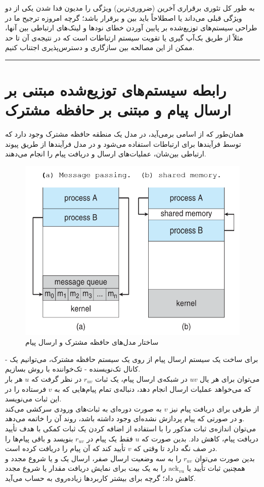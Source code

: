 \documentclass{article}
\begin{document}
\begin{multicols}{2}
\begin{itemize}
\end{itemize}

\pagebreak

به طور کل تئوری  برقراری آخرین (ضروری‌ترین) ویژگی را مدیون فدا شدن یکی از دو ویژگی قبلی می‌داند یا اصطلاحاً باید
بین  و 
برقرار باشد؛ گرچه امروزه ترجیح ما در طراحی سیستم‌های توزیع‌شده بر پایین آوردن خطای نودها و لینک‌های ارتباطی بین آنها، مثلاً از طریق بک‌آپ گیری یا تقویت سیستم ارتباطات است که در نتیجه‌ی آن تا حد ممکن از این مصالحه بین سازگاری و دسترس‌پذیری اجتناب کنیم.
\rule{\linewidth}{1pt}
\section{رابطه سیستم‌های توزیع‌شده مبتنی بر 
ارسال پیام و مبتنی بر
حافظه مشترک}
همان‌طور که از اسامی برمی‌آید، در مدل  
یک منطقه حافظه مشترک وجود دارد که توسط فرآیندها برای ارتباطات استفاده می‌شود و در مدل 
فرآیندها از طریق پیوند ارتباطی بین‌شان، عملیات‌های ارسال و دریافت پیام را انجام می‌دهند.
\begin{figure}[H]
        \centering
        \includegraphics[width=0.8\linewidth]{Photos/HW1/shared-pass.png}
        \caption{ساختار مدل‌های حافظه مشترک و ارسال پیام}
        \label{fig:my_label}
\end{figure}
- برای ساخت یک سیستم ارسال پیام از روی یک سیستم حافظه مشترک، می‌توانیم یک کانال تک‌نویسنده - تک‌خواننده با روش  بسازیم.\\
می‌توان برای هر یال $uv$ در شبکه‌ی ارسال پیام، یک ثبات $r_{uv}$ در نظر گرفت که $u$ هر بار که می‌خواهد عملیات ارسال انجام دهد، دنباله‌ی تمام پیام‌هایی که به $v$ فرستاده را در این ثبات می‌نویسد.\\
از طرفی برای دریافت پیام نیز
$v$
به صورت دوره‌ای به ثبات‌های ورودی سرکشی می‌کند و در صورتی که پیام پردازش نشده‌ای وجود داشته باشد، روند آن را خاتمه می‌دهد.\\
می‌توان اندازه‌ی ثبات مذکور را با استفاده از اضافه کردن یک ثبات کمکی با هدف تأیید دریافت پیام، کاهش داد. بدین صورت که $u$ فقط یک پیام در
$r_{uv}$
بنویسد و باقی پیام‌ها را در صف نگه دارد تا وقتی که $v$ تأیید کند که آن پیام را دریافت کرده است.\\
بدین صورت می‌توان 
$r_{uv}$
را به سه وضعیت ارسال صفر، ارسال یک و  یا شروع مجدد و همچنین ثبات تأیید یا $\text{ack}_{vu}$ را به یک بیت
برای نمایش دریافت مقدار یا شروع مجدد کاهش داد؛ گرچه برای بیشتر کاربردها زیاده‌روی به حساب می‌آید.


\end{multicols}
\end{document}
